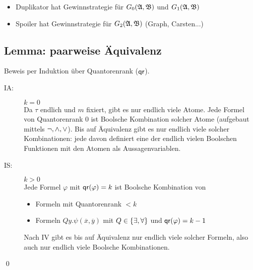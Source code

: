 \begin{itemize}  
  \item Duplikator hat Gewinnstrategie für $G_0(\mathfrak{A},\mathfrak{B})$ und $G_1(\mathfrak{A},\mathfrak{B})$
  
  \item Spoiler hat Gewinnstrategie für $G_2(\mathfrak{A},\mathfrak{B})$ (Graph, Carsten...)
\end{itemize}

\subsection{Lemma: paarweise Äquivalenz}

Beweis per Induktion über Quantorenrank ($\operatorname{\text{\textsf{qr}}}$).

\begin{description}
  \item[IA:] $k=0$\\
  Da $\tau$ endlich und $m$ fixiert, gibt es nur endlich viele Atome.
  Jede Formel von Quantorenrank 0 ist Boolsche Kombination solcher Atome
  (aufgebaut mittels $\operatorname{\neg}, \operatorname{\wedge}, \operatorname{\vee}$). Bis auf Äquivalenz gibt es nur
  endlich viele solcher Kombinationen: jede davon definiert eine der
  endlich vielen Boolschen Funktionen mit den Atomen als Aussagenvariablen.
  
  \item[IS:] $k>0$\\
  Jede Formel $\varphi$ mit $\operatorname{\text{\textsf{qr}}}(\varphi)=k$ ist Boolsche Kombination von
  \begin{itemize}
    \item Formeln mit Quantorenrank $< k$
    \item Formeln $Qy.\psi(\overline{x}, \overline{y})$ mit $Q\in\left\{\exists,\forall\right\}$ und $\operatorname{\text{\textsf{qr}}}(\varphi)=k-1$
  \end{itemize}
  Nach IV gibt es bis auf Äquivalenz nur endlich viele solcher Formeln,
  also auch nur endlich viele Boolsche Kombinationen.
\end{description}
\qed
